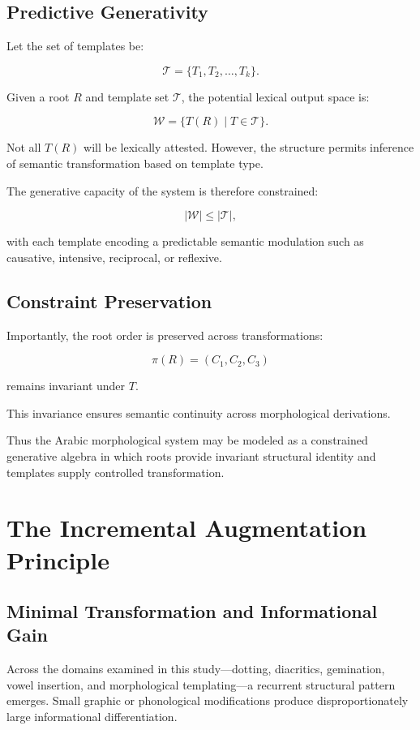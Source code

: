 \documentclass[11pt]{article}
\begin{document}
\subsection{Predictive Generativity}

Let the set of templates be:

\[
\mathcal{T} = \{T_1, T_2, \dots, T_k\}.
\]

Given a root $R$ and template set $\mathcal{T}$, the potential lexical output space is:

\[
\mathcal{W} = \{ T(R) \mid T \in \mathcal{T} \}.
\]

Not all $T(R)$ will be lexically attested. However, the structure permits inference of semantic transformation based on template type.

The generative capacity of the system is therefore constrained:

\[
|\mathcal{W}| \leq |\mathcal{T}|,
\]

with each template encoding a predictable semantic modulation such as causative, intensive, reciprocal, or reflexive.

\subsection{Constraint Preservation}

Importantly, the root order is preserved across transformations:

\[
\pi(R) = (C_1, C_2, C_3)
\]

remains invariant under $T$.

This invariance ensures semantic continuity across morphological derivations.

Thus the Arabic morphological system may be modeled as a constrained generative algebra in which roots provide invariant structural identity and templates supply controlled transformation.

\section{The Incremental Augmentation Principle}

\subsection{Minimal Transformation and Informational Gain}

Across the domains examined in this study—dotting, diacritics, gemination, vowel insertion, and morphological templating—a recurrent structural pattern emerges. Small graphic or phonological modifications produce disproportionately large informational differentiation.
\end{document}
